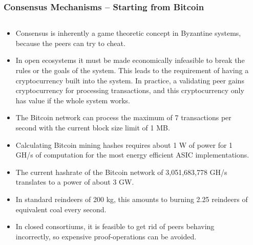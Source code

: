 \documentclass[8pt]{beamer}
\begin{document}
\begin{frame}
\frametitle{Consensus Mechanisms – Starting from Bitcoin}

\begin{columns}
\begin{column}{0.9\textwidth}

\begin{itemize}
 \item Consensus is inherently a game theoretic concept in Byzantine systems, because the peers can try to cheat.
 \item In open ecosystems it must be made economically infeasible to break the rules or the goals of the system. This leads to the requirement of having a cryptocurrency built into the system.
       In practice, a validating peer gains cryptocurrency for processing transactions, and this cryptocurrency only has value if the whole system works.
 \item The Bitcoin network can process the maximum of 7 transactions per second with the current block size limit of 1 MB.
 \item Calculating Bitcoin mining hashes requires about 1 W of power for 1 GH/s of computation for the most energy efficient ASIC implementations.
 \item The current hashrate of the Bitcoin network of 3,051,683,778 GH/s translates to a power of about 3 GW.
 \item In standard reindeers of 200 kg, this amounts to burning 2.25 reindeers of equivalent coal every second.
 \item In closed consortiums, it is feasible to get rid of peers behaving incorrectly, so expensive proof-operations can be avoided.
\end{itemize}
\end{column}
\begin{column}{0.1\textwidth}

\end{column}
\end{columns}
\end{frame}

{

}
\end{document}
